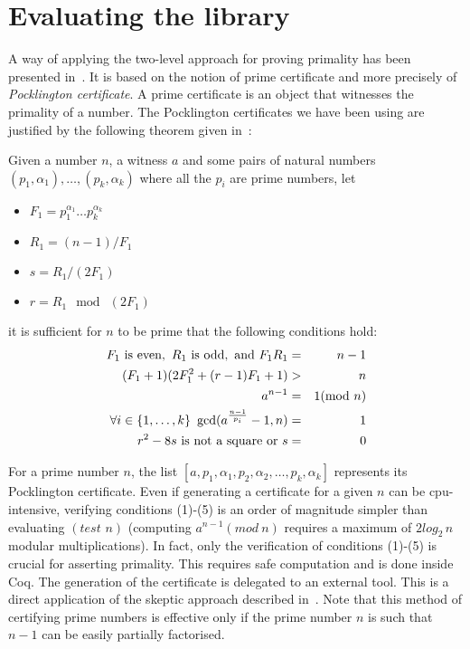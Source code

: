 \section{Evaluating the library \label{bench}}

A way of applying  the two-level approach for proving primality has been presented in~\cite{GreTheWer}.
It is based on the notion of prime certificate and more 
precisely of {\it Pocklington certificate}.
A prime certificate is an object that witnesses the primality of a number.
The Pocklington certificates we have been using are justified by the following
theorem given in~\cite{lehmer}:
\begin{theorem}\label{lehmer}
Given a number $n$, a witness $a$ and some pairs of natural numbers 
$(p_1,\alpha_1),\dots,(p_k,\alpha_k)$
 where all the $p_i$ are prime numbers,
 let
 \begin{itemize}
\item[]$F_1 = p_1^{\alpha_1}\dots p_k^{\alpha_k}$
\item[]$R_1 = (n - 1) / F_1$
\item[]$ s = R_1 / (2F_1)$
\item[] $r = R_1 \mod\ (2F_1)$
 \end{itemize}
 it is sufficient for $n$ to be prime that the following conditions hold:
\begin{eqnarray}
F_1 \,\,\hbox{is even},\,\,
R_1 \,\, \hbox{is odd}, \,\,\hbox{and}\,\,
F_1R_1  &=&  n -1\\
(F_1 + 1) (2F_1^2 + (r - 1) F_1 + 1) & >& n\\
a^{n-1} &=& 1 (\mod\ n)\\
\forall i\in\{1,\dots,k\}~\gcd(a^{\frac{n-1}{p_i}}-1,n)&=&1\\
r^2 - 8 s\,\,\mbox{is not a square}\,\,\hbox{or}\,\,s &=& 0
\end{eqnarray}
\end{theorem}
For a prime number $n$, the list 
$[a, p_1, \alpha_1, p_2, \alpha_2, \dots, p_k, \alpha_k]$
represents its Pocklington certificate.
Even if generating a certificate for a given $n$ can be cpu-intensive, 
verifying conditions (1)-(5) is an order of magnitude simpler than evaluating
$(\textit{test}\,\, n)$ (computing $a^{n-1} (\textit{mod}\ n)$ requires
a maximum of $2\textit{log}_2\, n$ modular multiplications). In fact, only
the verification of conditions (1)-(5) is crucial for asserting primality. 
This requires safe computation and is done inside {\sc Coq}.
The generation of the certificate is delegated to an external tool.
This is a direct application of the skeptic approach described 
in~\cite{BarBar,HarThe}. Note that this method of certifying prime numbers
is effective only if the prime number $n$ is such that  $n-1$ can be easily
partially factorised.
                 
